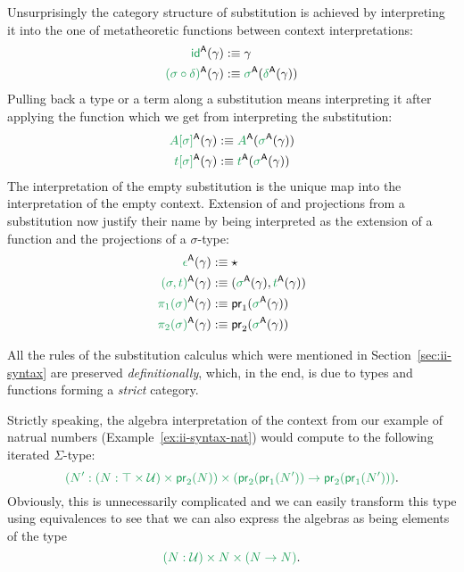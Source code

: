 \begin{defn}
Unsurprisingly the category structure of substitution is achieved by interpreting
it into the one of metatheoretic functions between context interpretations:
\begin{align*}
\grm{\id}^\CC(\gamma)			&:\equiv \gamma \\
\grm{(\sigma \circ \delta)}^\CC(\gamma)	&:\equiv \grm{\sigma}^\CC(\grm{\delta}^\CC(\gamma))
\end{align*}
Pulling back a type or a term along a substitution means interpreting it after
applying the function which we get from interpreting the substitution:
\begin{align*}
\grm{A[\sigma]}^\CC(\gamma)		&:\equiv \grm{A}^\CC(\grm{\sigma}^\CC(\gamma)) \\
\grm{t[\sigma]}^\CC(\gamma)		&:\equiv \grm{t}^\CC(\grm{\sigma}^\CC(\gamma))
\end{align*}
The interpretation of the empty substitution is the unique map into the interpretation
of the empty context.
Extension of and projections from a substitution now justify their name by being
interpreted as the extension of a function and the projections of a $\sigma$-type:
\begin{align*}
\grm{\epsilon}^\CC(\gamma)		&:\equiv \star \\
\grm{(\sigma, t)}^\CC(\gamma)		&:\equiv (\grm{\sigma}^\CC(\gamma), \grm{t}^\CC(\gamma)) \\
\grm{\pi_1(\sigma)}^\CC(\gamma)		&:\equiv \pr_1(\grm{\sigma}^\CC(\gamma)) \\
\grm{\pi_2(\sigma)}^\CC(\gamma)		&:\equiv \pr_2(\grm{\sigma}^\CC(\gamma))
\end{align*}

All the rules of the substitution calculus which were mentioned in Section~\ref{sec:ii-syntax}
are preserved \emph{definitionally}, which, in the end, is due to types and
functions forming a \emph{strict} category. %


\end{defn}

\begin{example}\label{ex:iit-nat-alg}
Strictly speaking, the algebra interpretation of the
context from our example of natrual numbers (Example~\ref{ex:ii-syntax-nat})
would compute to the following iterated $\Sigma$-type:
\begin{equation*}
\grm{\left(N' : (N : \top \times \UU) \times \pr_2(N)\right)
  \times \left(\pr_2(\pr_1(N')) \to \pr_2(\pr_1(N')) \right) } \text{.}
\end{equation*}
Obviously, this is unnecessarily complicated and we can easily transform this
type using equivalences to see that we can also express the algebras as being
elements of the type
\begin{equation*}
\grm{(N : \UU) \times N \times (N \to N)} \text{.}
\end{equation*}
\end{example}

